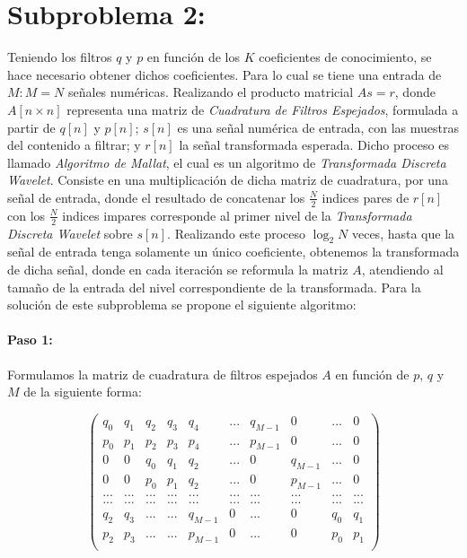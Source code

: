 \documentclass[11pt]{article}
\begin{document}
\section*{Subproblema 2:}
Teniendo los filtros \(q\) y \(p\) en función de los \(K\) coeficientes de conocimiento, se hace necesario obtener dichos coeficientes. Para lo cual se tiene una entrada de \(M : M = N\) 
señales numéricas. Realizando el producto matricial \(As = r\), donde \(A[n \times n]\) representa una matriz de {\it Cuadratura de Filtros Espejados}, formulada a partir de 
\(q[n]\) y \(p[n]\); \(s[n]\) es una señal numérica de entrada, con las muestras del contenido a filtrar; y \(r[n]\) la señal transformada esperada. Dicho proceso es llamado {\it Algoritmo 
de Mallat}, el cual es un algoritmo de {\it Transformada Discreta Wavelet}. Consiste en una multiplicación de dicha matriz de cuadratura, por una señal de entrada, donde el resultado de concatenar 
los \(\frac{N}{2}\) indices pares de \(r[n]\) con los \(\frac{N}{2}\) indices impares corresponde al primer nivel de la {\it Transformada Discreta Wavelet} sobre \(s[n]\). Realizando este proceso \(\log_{2}{N}\) 
veces, hasta que la señal de entrada tenga solamente un único coeficiente, obtenemos la transformada de dicha señal, donde en cada iteración se reformula la matriz \(A\), atendiendo al tamaño de la entrada 
del nivel correspondiente de la transformada. Para la solución de este subproblema se propone el siguiente algoritmo:


\paragraph*{Paso 1:}
Formulamos la matriz de cuadratura de filtros espejados \(A\) en función de \(p\), \(q\) y \(M\) de la siguiente forma:

\begin{equation}
    \begin{pmatrix}
        q_0 & q_1 & q_2 & q_3 & q_4 & ... & q_{M - 1} & 0 & ... & 0\\ 
        p_0 & p_1 & p_2 & p_3 & p_4 & ... & p_{M - 1} & 0 & ... & 0\\ 
        0 & 0 & q_0 & q_1 & q_2 & ... & 0 & q_{M - 1} & ... & 0\\ 
        0 & 0 & p_0 & p_1 & q_2 & ... & 0 & p_{M - 1} & ... & 0\\ 
        ... & ... & ... & ... & ... & ... & ... & ... & ... & ...\\
        ... & ... & ... & ... & ... & ... & ... & ... & ... & ...\\
        q_2 & q_3 & ... & ... & q_{M - 1} & 0 &... & 0 & q_0 & q_1\\
        p_2 & p_3 & ... & ... & p_{M - 1} & 0 &... & 0 & p_0 & p_1\\
    \end{pmatrix}
\end{equation}
\end{document}
